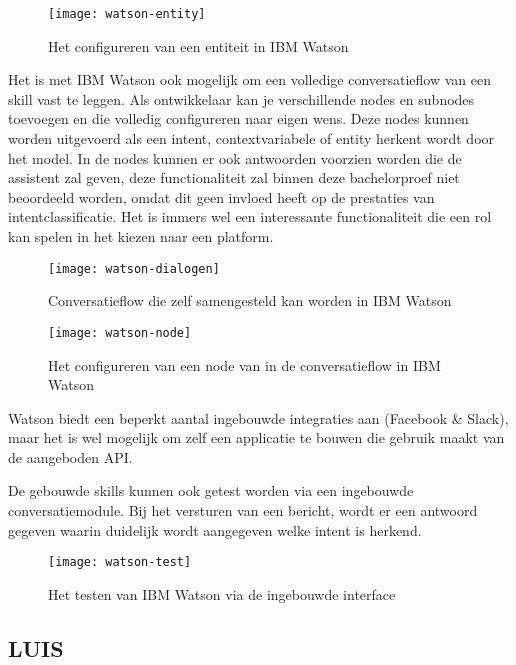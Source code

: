 \begin{figure}[H]
    \label{fig:watson-entity}
    \centering
    \texttt{[image: watson-entity]}
    \caption{Het configureren van een entiteit in IBM Watson}
\end{figure}

Het is met IBM Watson ook mogelijk om een volledige conversatieflow van een skill vast te leggen. Als ontwikkelaar kan je verschillende nodes en subnodes toevoegen en die volledig configureren naar eigen wens. Deze nodes kunnen worden uitgevoerd als een intent, contextvariabele of entity herkent wordt door het model. In de nodes kunnen er ook antwoorden voorzien worden die de assistent zal geven, deze functionaliteit zal binnen deze bachelorproef niet beoordeeld worden, omdat dit geen invloed heeft op de prestaties van intentclassificatie. Het is immers wel een interessante functionaliteit die een rol kan spelen in het kiezen naar een platform.

\begin{figure}[H]
    \label{fig:watson-dialogen}
    \centering
    \texttt{[image: watson-dialogen]}
    \caption{Conversatieflow die zelf samengesteld kan worden in IBM Watson}
\end{figure}

\begin{figure}[H]
    \label{fig:watson-node}
    \centering
    \texttt{[image: watson-node]}
    \caption{Het configureren van een node van in de conversatieflow in IBM Watson}
\end{figure}

Watson biedt een beperkt aantal ingebouwde integraties aan (Facebook \& Slack), maar het is wel mogelijk om zelf een applicatie te bouwen die gebruik maakt van de aangeboden API.

De gebouwde skills kunnen ook getest worden via een ingebouwde conversatiemodule. Bij het versturen van een bericht, wordt er een antwoord gegeven waarin duidelijk wordt aangegeven welke intent is herkend.

\begin{figure}[H]
    \label{fig:watson-test}
    \centering
    \texttt{[image: watson-test]}
    \caption{Het testen van IBM Watson via de ingebouwde interface}
\end{figure}

\subsection{LUIS}
\label{subsec:werking-platformen-luis}

